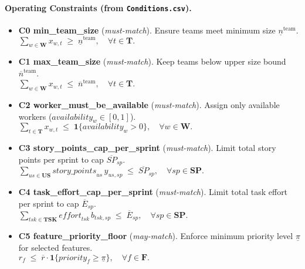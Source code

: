 \documentclass[11pt,a4paper]{article}
\begin{document}
\paragraph{Operating Constraints (from \texttt{Conditions.csv}).}
\begin{itemize}[leftmargin=2em,itemsep=0.6em]
  \item \textbf{C0 min\_team\_size} (\emph{must-match}). Ensure teams meet minimum size $\underline{n}^{\text{team}}$.\\
  $\displaystyle \sum_{w \in \mathbf{W}} x_{w,t} \;\ge\; \underline{n}^{\text{team}}, \quad \forall t \in \mathbf{T}.$

  \item \textbf{C1 max\_team\_size} (\emph{must-match}). Keep teams below upper size bound $\overline{n}^{\text{team}}$.\\
  $\displaystyle \sum_{w \in \mathbf{W}} x_{w,t} \;\le\; \overline{n}^{\text{team}}, \quad \forall t \in \mathbf{T}.$

  \item \textbf{C2 worker\_must\_be\_available} (\emph{must-match}). Assign only available workers ($\textit{availability}_w\in[0,1]$).\\
  $\displaystyle \sum_{t \in \mathbf{T}} x_{w,t} \;\le\; \mathbf{1}\{\textit{availability}_w>0\}, \quad \forall w \in \mathbf{W}.$

  \item \textbf{C3 story\_points\_cap\_per\_sprint} (\emph{must-match}). Limit total story points per sprint to cap $\overline{SP}_{sp}$.\\
  $\displaystyle \sum_{us \in \mathbf{US}} \textit{story\_points}_{us}\, y_{us,sp} \;\le\; \overline{SP}_{sp}, \quad \forall sp \in \mathbf{SP}.$

  \item \textbf{C4 task\_effort\_cap\_per\_sprint} (\emph{must-match}). Limit total task effort per sprint to cap $\overline{E}_{sp}$.\\
  $\displaystyle \sum_{tsk \in \mathbf{TSK}} \textit{effort}_{tsk}\, b_{tsk,sp} \;\le\; \overline{E}_{sp}, \quad \forall sp \in \mathbf{SP}.$

  \item \textbf{C5 feature\_priority\_floor} (\emph{may-match}). Enforce minimum priority level $\underline{\pi}$ for selected features.\\
  $\displaystyle r_f \;\le\; \overline{r} \cdot \mathbf{1}\{\textit{priority}_f \ge \underline{\pi}\}, \quad \forall f \in \mathbf{F}.$


\end{itemize}
\end{document}
